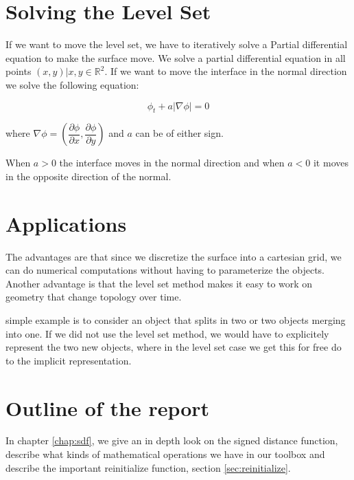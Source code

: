 
\section*{Solving the Level Set}\label{sec:intro:solve} 

If we want to move the level set, we have to iteratively solve a Partial
differential equation to make the surface move. We solve a partial
differential equation in all points $(x,y) | x,y \in
\mathbb{R}^{2}$. If we want to move the interface in the normal
direction we solve the following equation:

\begin{equation}
\phi_{t} + a|\nabla \phi| = 0
\end{equation}\label{eq:normMove}

where $\nabla \phi = (\dfrac{\partial \phi}{\partial x},
\dfrac{\partial \phi}{\partial y})$ and $a$ can be of either sign.

When $a > 0$ the interface moves in the normal direction and when $a <
0$ it moves in the opposite direction of the normal.


\section*{Applications}

The advantages are that since we discretize the surface into a
cartesian grid, we can do numerical computations without having to
parameterize the objects. Another advantage is that the level set
method makes it easy to work on geometry that change topology over
time.


simple example is to consider an object that splits in two or two
objects merging into one. If we did not use the level set method, we
would have to explicitely represent the two new objects, where in the
level set case we get this for free do to the implicit representation.


\newpage

\section*{Outline of the report}

In chapter \vref{chap:sdf}, we give an in depth look on the signed
distance function, describe what kinds of mathematical operations we
have in our toolbox and describe the important reinitialize function,
section \vref{sec:reinitialize}.

